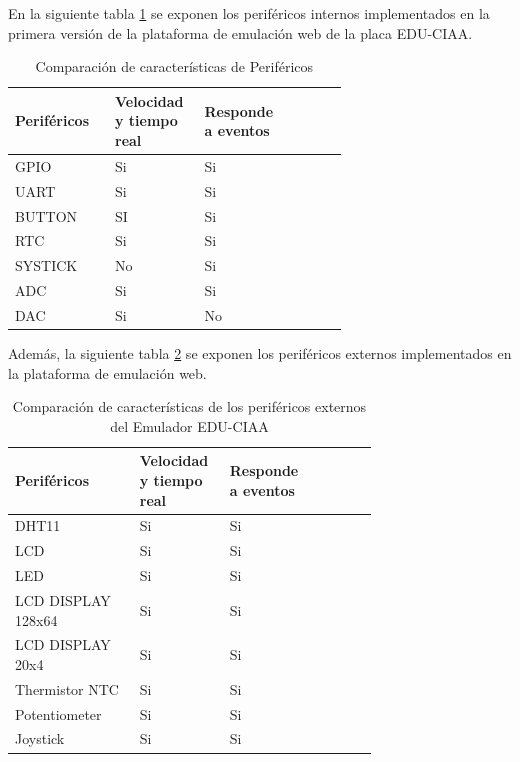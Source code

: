 En la siguiente tabla \ref{tab:perifericosInternosCIAA} se exponen los  periféricos internos implementados en la primera versión de la plataforma de emulación web de la placa EDU-CIAA.

\begin{table}[h]
\centering
\caption[Comparación de características de periféricos internos del Emulador EDU-CIAA]{Comparación de características de Periféricos}
\begin{tabular}{p{0.24\linewidth} p{0.14\linewidth}  p{0.14\linewidth}  p{0.14\linewidth}}
\toprule
\textbf{Periféricos} 
& \textbf{Velocidad y tiempo real}
& \textbf{Responde a eventos}
\\
\midrule
GPIO & Si & Si  \\
UART & Si & Si \\
BUTTON & SI & Si \\
RTC & Si & Si  \\
SYSTICK & No & Si \\
ADC & Si & Si \\
DAC & Si & No \\
\bottomrule
\hline
\end{tabular}
\label{tab:perifericosInternosCIAA}
\end{table}


Además, la siguiente tabla \ref{tab:perifericosExternosCIAA} se exponen los  periféricos externos implementados en la plataforma de emulación web.

\hfill \break
\hfill \break
\hfill \break
\hfill \break

\begin{table}[h]
\centering
\caption[Comparación de características de periféricos externos del Emulador EDU-CIAA]{Comparación de características de los periféricos externos del Emulador EDU-CIAA}
\begin{tabular}{p{0.30\linewidth} p{0.14\linewidth}  p{0.14\linewidth}  p{0.14\linewidth}}
\toprule
\textbf{Periféricos} 
& \textbf{Velocidad y tiempo real}
& \textbf{Responde a eventos}
\\
\midrule
DHT11 & Si & Si  \\
LCD & Si & Si  \\
LED & Si & Si  \\
LCD DISPLAY 128x64 & Si & Si \\
LCD DISPLAY 20x4 & Si & Si \\
Thermistor NTC & Si & Si \\
Potentiometer & Si & Si \\
Joystick & Si & Si \\
\bottomrule
\hline
\end{tabular}
\label{tab:perifericosExternosCIAA}
\end{table}


